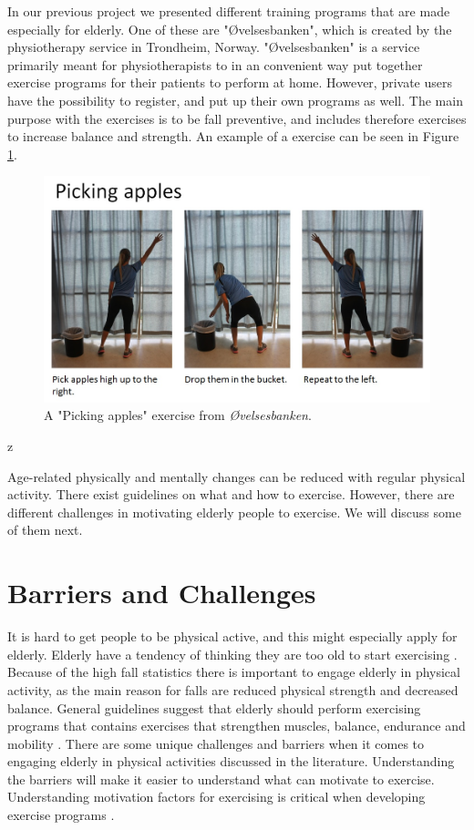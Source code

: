 In our previous project \cite{project} we presented different training programs that are made especially for elderly. One of these are "Øvelsesbanken", which is created by the physiotherapy service in Trondheim, Norway.  "Øvelsesbanken" is a service primarily meant for physiotherapists to in an convenient way put together exercise programs for their patients to perform at home. However, private users have the possibility to register, and put up their own programs as well. The main purpose with the exercises is to be fall preventive, and includes therefore exercises to increase balance and strength.  An example of a exercise can be seen in Figure \ref{pickingapples}.

\begin{figure} [H]
\centering
\includegraphics[scale=0.5]{PickingApplesAlone.jpg}
\caption[Exercise - picking apples]{A "Picking apples" exercise from \emph{Øvelsesbanken}.}
\label{pickingapples}
\end{figure}z

Age-related physically and mentally changes can be reduced with regular physical activity. There exist guidelines on what and how to exercise. However, there are different challenges in motivating elderly people to exercise. We will discuss some of them next. 

\section{Barriers and Challenges}
\label{sec:barriers}
It is hard to get people to be physical active, and this might especially apply for elderly. Elderly have a tendency of thinking they are too old to start exercising \cite{schutzer}. Because of the high fall statistics there is important to engage elderly in physical activity, as the main reason for falls are reduced physical strength and decreased balance. General guidelines suggest that elderly should perform exercising programs that contains exercises that strengthen muscles, balance, endurance and mobility \cite{gruppetrening-trheim}. There are some unique challenges and barriers when it comes to engaging elderly in physical activities discussed in the literature. Understanding the barriers will make it easier to understand what can motivate to exercise. Understanding motivation factors for exercising is critical when developing exercise programs \cite{chao}.

